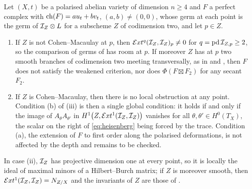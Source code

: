 \begin{corollary}%
\label{cor:cmdichotomy}
Let $(X,t)$ be a polarised abelian variety of dimension $n\ge4$ and $F$ a
perfect complex with $\operatorname{ch}(F)=au_{t}+bv_{t}$, $(a,b)\ne(0,0)$, whose germ at
each point is the germ of $\mathcal{I}_{Z}\otimes L$ for a subscheme $Z$ of
codimension two, and let $p\in Z$.
\begin{enumerate}[label=\textup{(\roman*)},leftmargin=2.6em]
\item If $Z$ is not Cohen--Macaulay at $p$, then
  $\mathcal{E} xt^{q}(\mathcal{I}_{Z},\mathcal{I}_{Z})_{p}\ne0$ for $q=\operatorname{pd}\mathcal{I}_{Z,p}\ge2$,
  so the comparison of germs of  has room at $p$. If moreover
  $Z$ has at $p$ two smooth branches of codimension two meeting
  transversally, as in  and
  , then $F$ does not satisfy the weakened
  criterion, nor does $\Phi(F\boxtimes F_{2})$ for any secant $F_{2}$.
\item If $Z$ is Cohen--Macaulay, then there is no local obstruction at any
  point. Condition (b) of (iii) is then a single global
  condition: it holds if and only if the image of $A_{\theta}A_{\theta'}$ in
  $H^{1}\bigl(Z,\mathcal{E} xt^{1}(\mathcal{I}_{Z},\mathcal{I}_{Z})\bigr)$ vanishes for all
  $\theta,\theta'\in H^{0}(T_{X})$, the scalar on the right of
  \eqref{eq:heisenberg} being forced by the trace. Condition (a), the
  extension of $F$ to first order along the polarised deformations, is
  not affected by the depth and remains to be checked.
\end{enumerate}
In case (ii), $\mathcal{I}_{Z}$ has projective dimension one at every point, so it is
locally the ideal of maximal minors of a Hilbert--Burch matrix; if $Z$ is
moreover smooth, then $\mathcal{E} xt^{1}(\mathcal{I}_{Z},\mathcal{I}_{Z})=N_{Z/X}$ and the invariants
of $Z$ are those of .
\end{corollary}

